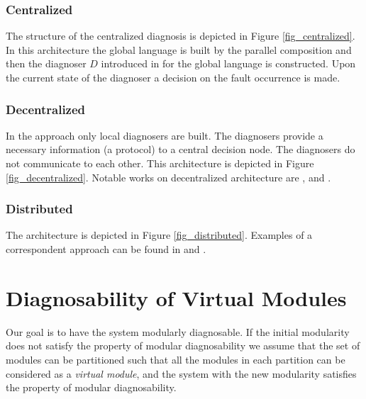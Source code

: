 \documentclass[a4paper, 10pt, conference]{ieeeconf}
\begin{document}
\subsubsection{Centralized}
The structure of the centralized diagnosis is depicted in
Figure \ref{fig_centralized}. In this architecture the global language is
built by the parallel composition and then the diagnoser $D$ introduced in
\cite{sampath_diagnosability_1995} for the global language is constructed. Upon
the current state of the diagnoser a decision on the fault occurrence is made.

\subsubsection{Decentralized}
In the approach only local diagnosers are built.
The diagnosers provide a necessary information (a protocol) to a central
decision node. The diagnosers do not communicate to each other. This
architecture is depicted in Figure \ref{fig_decentralized}.
Notable works on decentralized architecture are
\cite{debouk_coordinated_1998},
\cite{contant_diagnosability_2006} and \cite{wang_diagnosis_2007}.

\subsubsection{Distributed}
The architecture is depicted in Figure \ref{fig_distributed}.
Examples of a correspondent approach can be found in
\cite{pencole_formal_2005} and \cite{schumann_decentralised_2010}.


\section{Diagnosability of Virtual Modules}
\label{sec:Proposal}

Our goal is to have the system modularly diagnosable. If the initial modularity
does not satisfy the property of modular diagnosability we assume that the set
of modules can be partitioned such that all the modules in each partition can be
considered as a \emph{virtual module}, and the system with the new modularity
satisfies the property of modular diagnosability.
\end{document}
